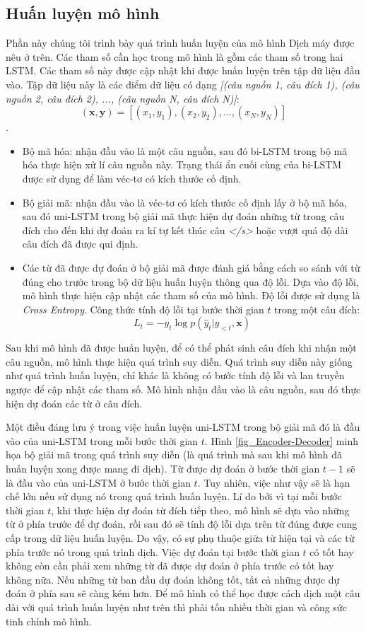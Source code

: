 \subsection{Huấn luyện mô hình}
Phần này chúng tôi trình bày quá trình huấn luyện của mô hình Dịch máy được nêu ở trên. Các tham số cần học trong mô hình là gồm các tham số trong hai LSTM. Các tham số này được cập nhật khi được huấn luyện trên tập dữ liệu đầu vào. Tập dữ liệu này là các điểm dữ liệu có dạng \textit{[(câu nguồn 1, câu đích 1), (câu nguồn 2, câu đích 2), ..., (câu nguồn N, câu đích N)]}: $$(\bm{x}, \bm{y}) = [(x_1, y_1), (x_2, y_2), ..., (x_N, y_N)]$$.
\begin{itemize}
	\item Bộ mã hóa: nhận đầu vào là một câu nguồn, sau đó bi-LSTM trong bộ mã hóa thực hiện xử lí câu nguồn này. Trạng thái ẩn cuối cùng của bi-LSTM được sử dụng để làm véc-tơ có kích thước cố định.
	\item Bộ giải mã: nhận đầu vào là véc-tơ có kích thước cố định lấy ở bộ mã hóa, sau đó uni-LSTM trong bộ giải mã thực hiện dự đoán những từ trong câu đích cho đến khi dự đoán ra kí tự kết thúc câu \textit{</s>} hoặc vượt quá độ dài câu đích đã được qui định.
	\item Các từ đã được dự đoán ở bộ giải mã được đánh giá bằng cách so sánh với từ đúng cho trước trong bộ dữ liệu huấn luyện thông qua độ lỗi. Dựa vào độ lỗi, mô hình thực hiện cập nhật các tham số của mô hình. Độ lỗi được sử dụng là \textit{Cross Entropy}. Công thức tính độ lỗi tại bước thời gian $t$ trong một câu đích:
	$$ L_t = - y_t \log{p(\hat{y}_t | y_{<t}, \bm{x})} $$
\end{itemize}

Sau khi mô hình đã được huấn luyện, để có thể phát sinh câu đích khi nhận một câu nguồn, mô hình thực hiện quá trình suy diễn. Quá trình suy diễn này giống như quá trình huấn luyện, chỉ khác là không có bước tính độ lỗi và lan truyền ngược để cập nhật các tham số. Mô hình nhận đầu vào là câu nguồn, sau đó thực hiện dự đoán các từ ở câu đích.

Một điều đáng lưu ý trong việc huấn luyện uni-LSTM trong bộ giải mã đó là đầu vào của uni-LSTM trong mỗi bước thời gian $t$. Hình \ref{fig_Encoder-Decoder} minh họa bộ giải mã trong quá trình suy diễn (là quá trình mà sau khi mô hình đã huấn luyện xong được mang đi dịch). Từ được dự đoán ở bước thời gian $t-1$ sẽ là đầu vào của uni-LSTM ở bước thời gian $t$. Tuy nhiên, việc như vậy sẽ là hạn chế lớn nếu sử dụng nó trong quá trình huấn luyện. Lí do bởi vì tại mỗi bước thời gian $t$, khi thực hiện dự đoán từ đích tiếp theo, mô hình sẽ dựa vào những từ ở phía trước để dự đoán, rồi sau đó sẽ tính độ lỗi dựa trên từ đúng được cung cấp trong dữ liệu huấn luyện. Do vậy, có sự phụ thuộc giữa từ hiện tại và các từ phía trước nó trong quá trình dịch. Việc dự đoán tại bước thời gian $t$ có tốt hay không còn cần phải xem những từ đã được dự đoán ở phía trước có tốt hay không nữa. Nếu những từ ban đầu dự đoán không tốt, tất cả những được dự đoán ở phía sau sẽ càng kém hơn. Để mô hình có thể học được cách dịch một câu dài với quá trình huấn luyện như trên thì phải tốn nhiều thời gian và công sức tinh chỉnh mô hình.
 
